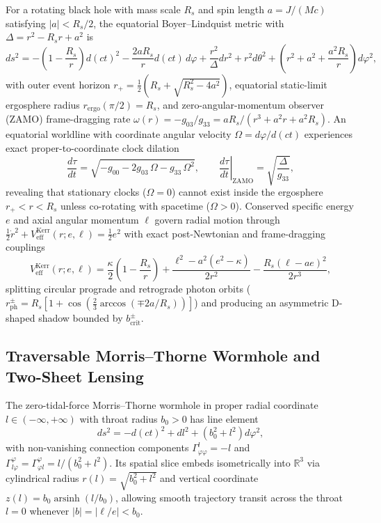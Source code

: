 \documentclass[12pt]{article}
\begin{document}
For a rotating black hole with mass scale $R_s$ and spin length $a = J / (Mc)$ satisfying $|a| < R_s/2$, the equatorial Boyer--Lindquist metric \cite{kerr1963} with $\Delta = r^2 - R_s r + a^2$ is
\begin{equation}
ds^2 = -\left(1 - \frac{R_s}{r}\right) d(ct)^2
     - \frac{2 a R_s}{r} d(ct)\,d\varphi
     + \frac{r^2}{\Delta} dr^2 + r^2 d\theta^2
     + \left(r^2 + a^2 + \frac{a^2 R_s}{r}\right) d\varphi^2,
\end{equation}
with outer event horizon $r_+ = \frac{1}{2}(R_s + \sqrt{R_s^2 - 4a^2})$, equatorial static-limit ergosphere radius $r_{\text{ergo}}(\pi/2) = R_s$, and zero-angular-momentum observer (ZAMO) frame-dragging rate $\omega(r) = -g_{03}/g_{33} = a R_s / (r^3 + a^2 r + a^2 R_s)$. An equatorial worldline with coordinate angular velocity $\Omega = d\varphi / d(ct)$ experiences exact proper-to-coordinate clock dilation
\begin{equation}
\frac{d\tau}{dt} = \sqrt{-g_{00} - 2 g_{03}\,\Omega - g_{33}\,\Omega^2},
\qquad
\left.\frac{d\tau}{dt}\right|_{\text{ZAMO}} = \sqrt{\frac{\Delta}{g_{33}}},
\end{equation}
revealing that stationary clocks ($\Omega = 0$) cannot exist inside the ergosphere $r_+ < r < R_s$ unless co-rotating with spacetime ($\Omega > 0$). Conserved specific energy $e$ and axial angular momentum $\ell$ govern radial motion through $\frac{1}{2}\dot{r}^2 + V_{\text{eff}}^{\text{Kerr}}(r; e, \ell) = \frac{1}{2} e^2$ with exact post-Newtonian and frame-dragging couplings
\begin{equation}
V_{\text{eff}}^{\text{Kerr}}(r; e, \ell) =
\frac{\kappa}{2}\left(1 - \frac{R_s}{r}\right)
+ \frac{\ell^2 - a^2(e^2 - \kappa)}{2 r^2}
- \frac{R_s(\ell - a e)^2}{2 r^3},
\end{equation}
splitting circular prograde and retrograde photon orbits ($r_{\text{ph}}^{\pm} = R_s [1 + \cos(\frac{2}{3}\arccos(\mp 2a/R_s))]$) and producing an asymmetric D-shaped shadow bounded by $b_{\text{crit}}^{\pm}$.

\subsection{Traversable Morris--Thorne Wormhole and Two-Sheet Lensing}

The zero-tidal-force Morris--Thorne wormhole \cite{morris1988wormholes} in proper radial coordinate $l \in (-\infty, +\infty)$ with throat radius $b_0 > 0$ has line element
\begin{equation}
ds^2 = -d(ct)^2 + dl^2 + \left(b_0^2 + l^2\right) d\varphi^2,
\end{equation}
with non-vanishing connection components $\Gamma^l_{\varphi\varphi} = -l$ and $\Gamma^\varphi_{l\varphi} = \Gamma^\varphi_{\varphi l} = l / (b_0^2 + l^2)$. Its spatial slice embeds isometrically into $\mathbb{R}^3$ via cylindrical radius $r(l) = \sqrt{b_0^2 + l^2}$ and vertical coordinate $z(l) = b_0 \operatorname{arsinh}(l / b_0)$, allowing smooth trajectory transit across the throat $l = 0$ whenever $|b| = |\ell / e| < b_0$.
\end{document}

